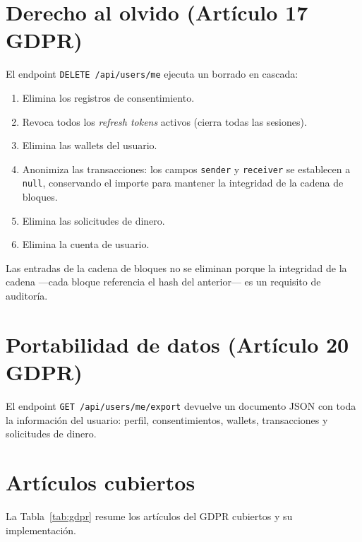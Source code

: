 \section{Derecho al olvido (Artículo 17 GDPR)}

El endpoint \texttt{DELETE /api/users/me} ejecuta un borrado en cascada:

\begin{enumerate}
  \item Elimina los registros de consentimiento.
  \item Revoca todos los \emph{refresh tokens} activos (cierra todas las sesiones).
  \item Elimina las wallets del usuario.
  \item Anonimiza las transacciones: los campos \texttt{sender} y \texttt{receiver} se establecen a \texttt{null}, conservando el importe para mantener la integridad de la cadena de bloques.
  \item Elimina las solicitudes de dinero.
  \item Elimina la cuenta de usuario.
\end{enumerate}

Las entradas de la cadena de bloques no se eliminan porque la integridad de la cadena ---cada bloque referencia el hash del anterior--- es un requisito de auditoría.

\section{Portabilidad de datos (Artículo 20 GDPR)}

El endpoint \texttt{GET /api/users/me/export} devuelve un documento JSON con toda la información del usuario: perfil, consentimientos, wallets, transacciones y solicitudes de dinero.

\section{Artículos cubiertos}

La Tabla~\ref{tab:gdpr} resume los artículos del GDPR cubiertos y su implementación.

